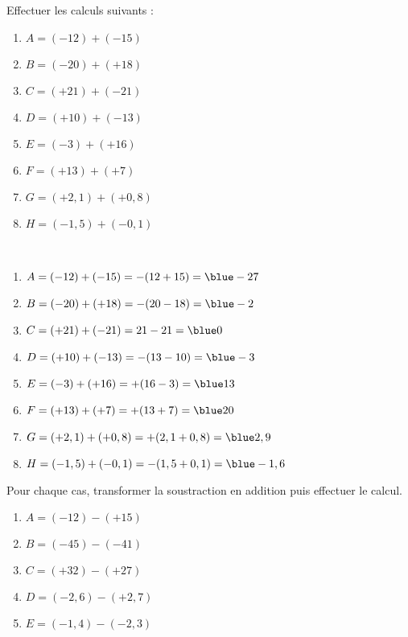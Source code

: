 \begin{colonne*exercice}

\begin{exercice} %
   Effectuer les calculs suivants :
   \begin{enumerate}
      \item $A =(-12)+(-15)$
      \item $B =(-20)+(+18)$
      \item $C =(+21)+(-21)$
      \item $D =(+10)+(-13)$
      \item $E =(-3)+(+16)$
      \item $F =(+13)+(+7)$
      \item $G =(+2,1)+(+0,8)$
      \item $H =(-1,5)+(-0,1)$
   \end{enumerate}
\end{exercice}

\begin{corrige}
   \ \\ [-5mm]
   \begin{enumerate}
      \item $A =(-12)+(-15) =-(12+15) ={\blue -27}$ \smallskip
      \item $B =(-20)+(+18) =-(20-18) ={\blue -2}$ \smallskip
      \item $C =(+21)+(-21) =21-21 ={\blue 0}$ \smallskip
      \item $D =(+10)+(-13) =-(13-10) ={\blue -3}$ \smallskip
      \item $E =(-3)+(+16) =+(16-3) ={\blue 13}$ \smallskip
      \item $F =(+13)+(+7) =+(13+7) ={\blue 20}$ \smallskip
      \item $G =(+2,1)+(+0,8) =+(2,1+0,8) ={\blue 2,9}$ \smallskip
      \item $H =(-1,5)+(-0,1) =-(1,5+0,1) ={\blue -1,6}$
   \end{enumerate}
\end{corrige}

\bigskip


\begin{exercice} %
   Pour chaque cas, transformer la soustraction en addition puis effectuer le calcul.
   \begin{enumerate}
      \item $A =(-12)-(+15)$
      \item $B =(-45)-(-41)$
      \item $C =(+32)-(+27)$
      \item $D =(-2,6)-(+2,7)$
      \item $E =(-1,4)-(-2,3)$
   \end{enumerate}
\end{exercice}


\end{colonne*exercice}
